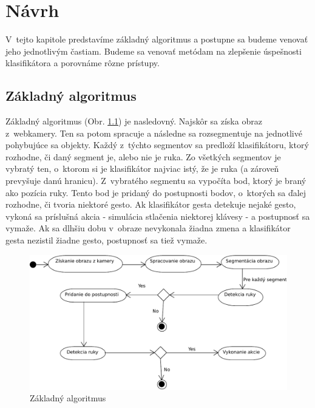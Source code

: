 \chapter{Návrh}\label{chap:design}

V~tejto kapitole predstavíme základný algoritmus a postupne sa budeme venovať jeho jednotlivým častiam. Budeme sa venovať metódam na zlepšenie úspešnosti klasifikátora a porovnáme rôzne prístupy. 
\bigskip

\section{Základný algoritmus}

Základný algoritmus (Obr. \ref{fig:base_alg}) je nasledovný. Najskôr sa získa obraz z~webkamery. Ten sa potom spracuje a následne sa rozsegmentuje na jednotlivé pohybujúce sa objekty.
Každý z~týchto segmentov sa predloží klasifikátoru, ktorý rozhodne, či daný segment je, alebo nie je ruka. Zo všetkých segmentov je vybratý ten, o~ktorom si je klasifikátor najviac istý, že je ruka (a zároveň prevyšuje danú hranicu). Z~vybratého segmentu sa vypočíta bod, ktorý je braný ako pozícia ruky. Tento bod je pridaný do postupnosti bodov, o~ktorých sa ďalej rozhodne, či tvoria niektoré gesto. Ak klasifikátor gesta detekuje nejaké gesto, vykoná sa príslušná akcia - simulácia stlačenia niektorej klávesy - a postupnosť sa vymaže. Ak sa dlhšiu dobu v~obraze nevykonala žiadna zmena a klasifikátor gesta nezistil žiadne gesto, postupnosť sa tiež vymaže.

\begin{figure}[htp]
    \centering
    \includegraphics[width=\textwidth]{images/BaseAlgorithm}
    \caption{Základný algoritmus}
    \label{fig:base_alg}
\end{figure}

